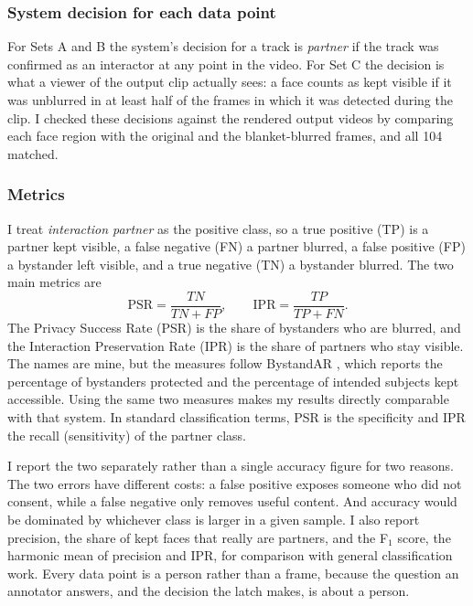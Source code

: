 \subsubsection{System decision for each data point}

For Sets A and B the system's decision for a track is \emph{partner} if the track was
confirmed as an interactor at any point in the video. For Set C the decision is what a
viewer of the output clip actually sees: a face counts as kept visible if it was unblurred
in at least half of the frames in which it was detected during the clip. I checked these
decisions against the rendered output videos by comparing each face region with the
original and the blanket-blurred frames, and all 104 matched.

\subsubsection{Metrics}
\label{sec:metrics}

I treat \emph{interaction partner} as the positive class, so a true positive (TP) is a
partner kept visible, a false negative (FN) a partner blurred, a false positive (FP) a
bystander left visible, and a true negative (TN) a bystander blurred. The two main metrics
are
\begin{equation}
  \mathrm{PSR} = \frac{TN}{TN + FP}, \qquad \mathrm{IPR} = \frac{TP}{TP + FN}.
  \label{eq:psr_ipr}
\end{equation}
The Privacy Success Rate (PSR) is the share of bystanders who are blurred, and the
Interaction Preservation Rate (IPR) is the share of partners who stay visible. The names
are mine, but the measures follow BystandAR \cite{bystandar}, which reports the percentage
of bystanders protected and the percentage of intended subjects kept accessible. Using the
same two measures makes my results directly comparable with that system. In standard
classification terms, PSR is the specificity and IPR the recall (sensitivity) of the
partner class.

I report the two separately rather than a single accuracy figure for two reasons. The two
errors have different costs: a false positive exposes someone who did not consent, while a
false negative only removes useful content. And accuracy would be dominated by whichever
class is larger in a given sample. I also report precision, the share of kept faces that
really are partners, and the F$_1$ score, the harmonic mean of precision and IPR, for
comparison with general classification work. Every data point is a person rather than a
frame, because the question an annotator answers, and the decision the latch makes, is
about a person.

